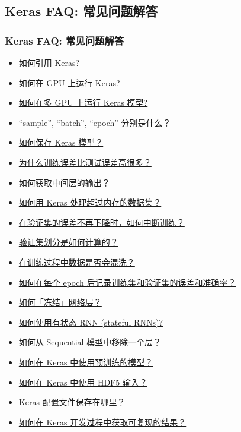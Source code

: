 \subsection{Keras FAQ: 常见问题解答}\label{keras-faq}

\subsubsection{Keras FAQ: 常见问题解答}
\begin{itemize}
\tightlist
\item
    \hyperref[how-should-i-cite-keras]{如何引用 Keras?}
\item
    \hyperref[how-can-i-run-keras-on-gpu]{如何在 GPU 上运行 Keras?}
\item
    \hyperref[how-can-i-run-a-keras-model-on-multiple-gpus]{如何在多 GPU 上运行 Keras 模型?}
\item
    \hyperref[what-does-sample-batch-epoch-mean]{``sample'', ``batch'', ``epoch'' 分别是什么？}
\item
    \hyperref[how-can-i-save-a-keras-model]{如何保存 Keras 模型？}
\item
    \hyperref[why-is-the-training-loss-much-higher-than-the-testing-loss]{为什么训练误差比测试误差高很多？}
\item
    \hyperref[how-can-i-obtain-the-output-of-an-intermediate-layer]{如何获取中间层的输出？}
\item
    \hyperref[how-can-i-use-keras-with-datasets-that-dont-fit-in-memory]{如何用 Keras 处理超过内存的数据集？}
\item
    \hyperref[how-can-i-interrupt-training-when-the-validation-loss-isnt-decreasing-anymore]{在验证集的误差不再下降时，如何中断训练？}
\item
    \hyperref[how-is-the-validation-split-computed]{验证集划分是如何计算的？}
\item
    \hyperref[is-the-data-shuffled-during-training]{在训练过程中数据是否会混洗？}
\item
    \hyperref[how-can-i-record-the-training-validation-loss-accuracy-at-each-epoch]{如何在每个 epoch 后记录训练集和验证集的误差和准确率？}
\item
    \hyperref[how-can-i-freeze-keras-layers]{如何「冻结」网络层？}
\item
    \hyperref[how-can-i-use-stateful-rnns]{如何使用有状态 RNN (stateful RNNs)?}
\item
    \hyperref[how-can-i-remove-a-layer-from-a-sequential-model]{如何从 Sequential 模型中移除一个层？}
\item
    \hyperref[how-can-i-use-pre-trained-models-in-keras]{如何在 Keras 中使用预训练的模型？}
\item
    \hyperref[how-can-i-use-hdf5-inputs-with-keras]{如何在 Keras 中使用 HDF5 输入？}
\item
    \hyperref[where-is-the-keras-configuration-file-stored]{Keras 配置文件保存在哪里？}
\item
    \hyperref[how-can-i-obtain-reproducible-results-using-keras-during-development]{如何在 Keras 开发过程中获取可复现的结果？}
\end{itemize}




